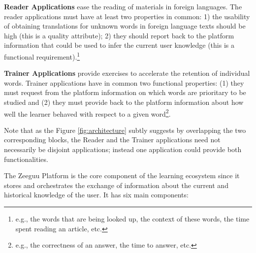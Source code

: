 \begin{description}
	
	\item {\bf Reader Applications} ease the reading of materials in foreign languages. The reader applications must have at least two properties in common: 
		1) the usability of obtaining translations for unknown words in foreign language texts should be high (this is a quality attribute); 
		2) they should report back to the platform information that could be used to infer the current user knowledge (this is a functional requirement).\footnote{e.g., the words that are being looked up, the context of these words, the time spent reading an article, etc.} 

	
		\item {\bf Trainer Applications} provide exercises to accelerate the retention of individual words. Trainer applications have in common two functional properties: (1) they must request from the platform information on which words are prioritary to be studied and (2) they must provide back to the platform information about how well the learner behaved with respect to a given word\footnote{e.g., the correctness of an answer, the time to answer, etc.}.

\end{description}

Note that as the Figure \ref{fig:architecture} subtly suggests by overlapping the two corresponding blocks, the Reader and the Trainer applications need not necessarily be disjoint applications; instead one application could provide both functionalities.


The Zeeguu Platform is the core component of the learning ecosystem since it stores and orchestrates the exchange of information about the current and historical knowledge of the user. It has six main components: 

